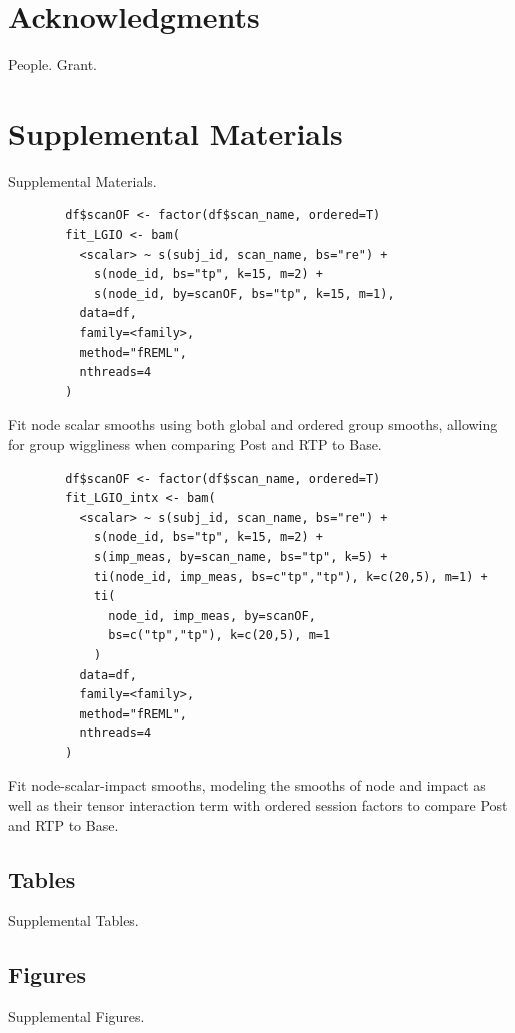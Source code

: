 \documentclass[12pt]{article}
\newcommand{\beginsupplement}{%
	\setcounter{table}{0}
	\renewcommand{\thetable}{S\arabic{table}}%
	\setcounter{figure}{0}
	\renewcommand{\thefigure}{S\arabic{figure}}%
}
\begin{document}
\section*{Acknowledgments}
\label{sec:ack}
People. Grant.



\pagebreak
\printbibliography
\pagebreak


\section{Supplemental Materials}
\label{sec:supp-materials}
\beginsupplement
Supplemental Materials.


\begin{equ}[H]
	\begin{lstlisting}
		df$scanOF <- factor(df$scan_name, ordered=T)
		fit_LGIO <- bam(
		  <scalar> ~ s(subj_id, scan_name, bs="re") +
		    s(node_id, bs="tp", k=15, m=2) +
		    s(node_id, by=scanOF, bs="tp", k=15, m=1),
		  data=df,
		  family=<family>,
		  method="fREML",
		  nthreads=4
		)
	\end{lstlisting}
	\caption{Fit node scalar smooths using both global and ordered group smooths, allowing for group wiggliness when comparing Post and RTP to Base.}
	\label{supp-code:gam-lgio}
\end{equ}


\begin{equ}[H]
	\begin{lstlisting}
		df$scanOF <- factor(df$scan_name, ordered=T)
		fit_LGIO_intx <- bam(
		  <scalar> ~ s(subj_id, scan_name, bs="re") +
		    s(node_id, bs="tp", k=15, m=2) +
			s(imp_meas, by=scan_name, bs="tp", k=5) +
			ti(node_id, imp_meas, bs=c"tp","tp"), k=c(20,5), m=1) +
			ti(
			  node_id, imp_meas, by=scanOF,
			  bs=c("tp","tp"), k=c(20,5), m=1
			)
		  data=df,
		  family=<family>,
		  method="fREML",
		  nthreads=4
		)
	\end{lstlisting}
	\caption{Fit node-scalar-impact smooths, modeling the smooths of node and impact as well as their tensor interaction term with ordered session factors to compare Post and RTP to Base.}
	\label{supp-code:gam-lgio-intx}
\end{equ}

\subsection{Tables}
\label{ssec:supp-tables}
Supplemental Tables.


\subsection{Figures}
\label{ssec:supp-figures}
Supplemental Figures.
\end{document}
